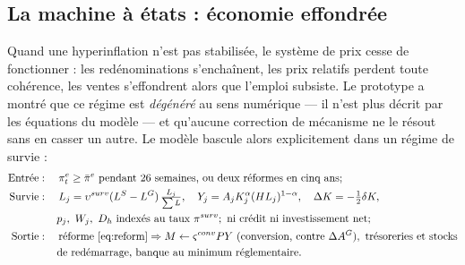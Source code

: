 \documentclass[11pt,a4paper]{article}
\begin{document}
\subsection{La machine à états : économie effondrée}
\label{sec:collapse}
Quand une hyperinflation n'est pas stabilisée, le système de prix cesse de fonctionner : les redénominations s'enchaînent, les prix relatifs perdent toute cohérence, les ventes s'effondrent alors que l'emploi subsiste. Le prototype a montré que ce régime est \emph{dégénéré} au sens numérique — il n'est plus décrit par les équations du modèle — et qu'aucune correction de mécanisme ne le résout sans en casser un autre. Le modèle bascule alors explicitement dans un régime de survie :
\begin{equation}
\begin{split}
\text{Entrée} &: \quad \pi^e_t \ge \bar\pi^e \text{ pendant 26 semaines,}\ \text{ou deux réformes en cinq ans} ;\\
\text{Survie} &: \quad L_j = \upsilon^{surv}(L^S - L^G)\,\tfrac{L_j}{\sum L}, \quad Y_j = A_jK_j^\alpha (HL_j)^{1-\alpha}, \quad \Delta K = -\tfrac12\delta K,\\
&\quad\ \ p_j,\ W_j,\ D_h \text{ indexés au taux } \pi^{surv} ;\ \text{ni crédit ni investissement net} ;\\
\text{Sortie} &: \quad \text{réforme \eqref{eq:reform}} \Rightarrow M \leftarrow \varsigma^{conv} PY \text{ (conversion, contre } \Delta A^G),\ \text{trésoreries et stocks}\\
&\quad\ \ \text{de redémarrage, banque au minimum réglementaire.}
\end{split}
\label{eq:collapse}
\end{equation}
\end{document}
